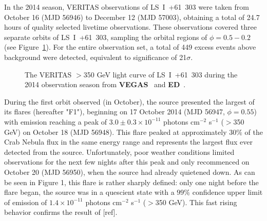 \documentclass[preprint2]{aastex}
\newcommand{\pflux}{photons cm$^{-2}$ s$^{-1}$}
\newcommand{\lsi}{LS~I~+61~303}
\begin{document}
In the 2014 season, VERITAS observations of \lsi{} were taken from October 16 (MJD 56946) to  December 12 (MJD 57003), obtaining a total of 24.7 hours of quality selected livetime observations. These observations covered three separate orbits of \lsi{}, sampling the orbital regions of $\phi = 0.5-0.2$ (see Figure~\ref{f:fig1}). For the entire observation set, a total of 449 excess events above background were detected, equivalent to significance of 21$\sigma$.

\begin{figure}[ht]
\centering
{}
\caption{The VERITAS $>$350 GeV light curve of \lsi{} during the 2014 observation season from \textbf{VEGAS}~ and \textbf{ED}~.}
\label{f:fig1}
\end{figure}

During the first orbit observed (in October), the source presented the largest of its flares (hereafter "F1"), beginning on 17 October 2014 (MJD 56947, $\phi =  0.55$) with emission reaching a peak of $3.0 \pm 0.3 \times10^{-11}$ \pflux{} ($>$350 GeV) on October 18 (MJD 56948). This flare peaked at approximately $30\%$ of the Crab Nebula flux in the same energy range and represents the largest flux ever detected from the source. Unfortunately, poor weather conditions limited observations for the next few nights after this peak and only recommenced on October 20 (MJD 56950), when the source had already quietened down. As can be seen in Figure 1, this flare is rather sharply defined: only one night before the flare began, the source was in a quescient state with a $99\%$ confidence upper limit of emission of $1.4 \times10^{-11}$ \pflux{} ($>$350 GeV). This fast rising behavior confirms the result of [ref].
\end{document}
